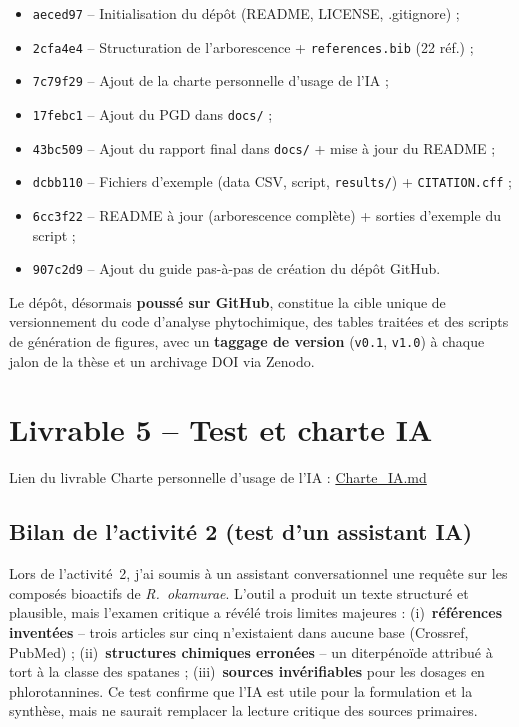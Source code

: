 \documentclass[11pt,a4paper]{article}
\begin{document}
\begin{itemize}
  \item \texttt{aeced97} -- Initialisation du dépôt (README, LICENSE, .gitignore) ;
  \item \texttt{2cfa4e4} -- Structuration de l'arborescence + \texttt{references.bib} (22 réf.) ;
  \item \texttt{7c79f29} -- Ajout de la charte personnelle d'usage de l'IA ;
  \item \texttt{17febc1} -- Ajout du PGD dans \texttt{docs/} ;
  \item \texttt{43bc509} -- Ajout du rapport final dans \texttt{docs/} + mise à jour du README ;
  \item \texttt{dcbb110} -- Fichiers d'exemple (data CSV, script, \texttt{results/}) + \texttt{CITATION.cff} ;
  \item \texttt{6cc3f22} -- README à jour (arborescence complète) + sorties d'exemple du script ;
  \item \texttt{907c2d9} -- Ajout du guide pas-à-pas de création du dépôt GitHub.
\end{itemize}

Le dépôt, désormais \textbf{poussé sur GitHub}, constitue la cible unique de
versionnement du code d'analyse phytochimique, des tables traitées et des scripts de
génération de figures, avec un \textbf{taggage de version} (\texttt{v0.1},
\texttt{v1.0}) à chaque jalon de la thèse et un archivage DOI via Zenodo.

\section{Livrable 5 -- Test et charte IA}
\begin{lienbox}{Lien du livrable}
Charte personnelle d'usage de l'IA :
\href{https://github.com/JihanElkhattabi/rugulopteryx-okamurae-these/blob/main/Charte_IA.md}{Charte\_IA.md}
\end{lienbox}

\subsection*{Bilan de l'activité 2 (test d'un assistant IA)}
Lors de l'activité~2, j'ai soumis à un assistant conversationnel une requête sur les
composés bioactifs de \textit{R.~okamurae}. L'outil a produit un texte structuré et
plausible, mais l'examen critique a révélé trois limites majeures : (i)~\textbf{références
inventées} -- trois articles sur cinq n'existaient dans aucune base (Crossref, PubMed) ;
(ii)~\textbf{structures chimiques erronées} -- un diterpénoïde attribué à tort à la
classe des spatanes ; (iii)~\textbf{sources invérifiables} pour les dosages en
phlorotannines. Ce test confirme que l'IA est utile pour la formulation et la
synthèse, mais ne saurait remplacer la lecture critique des sources primaires.
\end{document}
